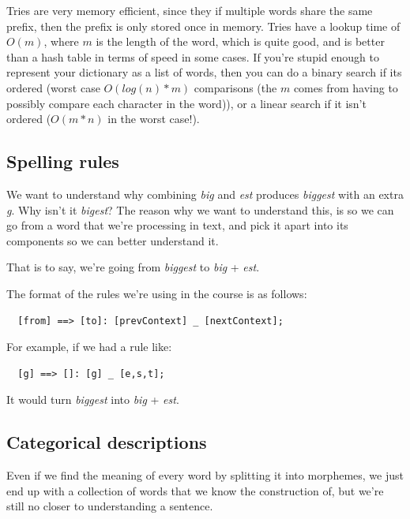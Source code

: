 Tries are very memory efficient, since they if multiple words share the same
prefix, then the prefix is only stored once in memory. Tries have a lookup time
of $O(m)$, where $m$ is the length of the word, which is quite good, and is
better than a hash table in terms of speed in some cases. If you're stupid
enough to represent your dictionary as a list of words, then you can do a binary
search if its ordered (worst case $O(log(n) * m)$ comparisons (the $m$ comes
from having to possibly compare each character in the word)), or a linear search
if it isn't ordered ($O(m*n)$ in the worst case!).

\subsection{Spelling rules}

We want to understand why combining \textit{big} and \textit{est} produces
\textit{biggest} with an extra \textit{g}. Why isn't it \textit{bigest}? The
reason why we want to understand this, is so we can go from a word that we're
processing in text, and pick it apart into its components so we can better
understand it.

That is to say, we're going from \textit{biggest} to \textit{big} +
\textit{est}.

The format of the rules we're using in the course is as follows:


\begin{verbatim}
  [from] ==> [to]: [prevContext] _ [nextContext];
\end{verbatim}

For example, if we had a rule like:

\begin{verbatim}
  [g] ==> []: [g] _ [e,s,t];
\end{verbatim}

It would turn \textit{biggest} into \textit{big} + \textit{est}.

\subsection{Categorical descriptions}

Even if we find the meaning of every word by splitting it into morphemes, we
just end up with a collection of words that we know the construction of, but
we're still no closer to understanding a sentence.


